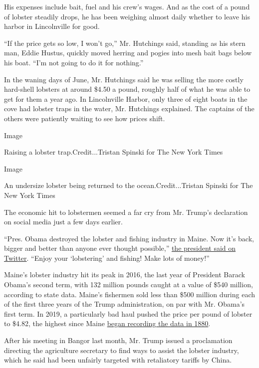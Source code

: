 His expenses include bait, fuel and his crew's wages. And as the cost of
a pound of lobster steadily drops, he has been weighing almost daily
whether to leave his harbor in Lincolnville for good.

``If the price gets so low, I won't go,'' Mr. Hutchings said, standing
as his stern man, Eddie Hustus, quickly moved herring and pogies into
mesh bait bags below his boat. ``I'm not going to do it for nothing.''

In the waning days of June, Mr. Hutchings said he was selling the more
costly hard-shell lobsters at around \$4.50 a pound, roughly half of
what he was able to get for them a year ago. In Lincolnville Harbor,
only three of eight boats in the cove had lobster traps in the water,
Mr. Hutchings explained. The captains of the others were patiently
waiting to see how prices shift.

Image

Raising a lobster trap.Credit...Tristan Spinski for The New York Times

Image

An undersize lobster being returned to the ocean.Credit...Tristan
Spinski for The New York Times

The economic hit to lobstermen seemed a far cry from Mr. Trump's
declaration on social media just a few days earlier.

``Pres. Obama destroyed the lobster and fishing industry in Maine. Now
it's back, bigger and better than anyone ever thought possible,''
\href{https://twitter.com/realDonaldTrump/status/1275951862269829121}{the
president said on Twitter}. ``Enjoy your `lobstering' and fishing! Make
lots of money!''

Maine's lobster industry hit its peak in 2016, the last year of
President Barack Obama's second term, with 132 million pounds caught at
a value of \$540 million, according to state data. Maine's fishermen
sold less than \$500 million during each of the first three years of the
Trump administration, on par with Mr. Obama's first term. In 2019, a
particularly bad haul pushed the price per pound of lobster to \$4.82,
the highest since Maine
\href{https://www.maine.gov/dmr/commercial-fishing/landings/documents/lobster.table.pdf}{began
recording the data in 1880}.

After his meeting in Bangor last month, Mr. Trump issued a proclamation
directing the agriculture secretary to find ways to assist the lobster
industry, which he said had been unfairly targeted with retaliatory
tariffs by China.

